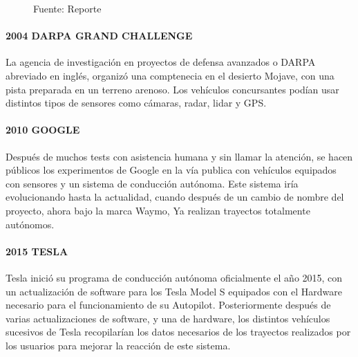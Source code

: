 \begin{figure}[H]
    \centering
    \qquad
    \caption[DAVE]{Fuente: Reporte \citep{LeCun:04-dave}}%
    \label{dave}%
\end{figure}

\paragraph{2004 DARPA GRAND CHALLENGE}
La agencia de investigación en proyectos de defensa avanzados o DARPA abreviado en inglés, organizó una comptenecia en el desierto Mojave, con una pista preparada en un terreno arenoso. Los vehículos concursantes podían usar distintos tipos de sensores como cámaras, radar, lidar y GPS. \citep{hooper_2004}

\paragraph{2010 GOOGLE}
Después de muchos tests con asistencia humana y sin llamar la atención, se hacen públicos los experimentos de Google en la vía publica con vehículos equipados con sensores y un sistema de conducción autónoma. Este sistema iría evolucionando hasta la actualidad, cuando después de un cambio de nombre del proyecto, ahora bajo la marca Waymo, Ya realizan trayectos totalmente autónomos. \citep{markoff_2010}

\paragraph{2015 TESLA}
Tesla inició su programa de conducción autónoma oficialmente el año 2015, con un actualización de software para los Tesla Model S equipados con el Hardware necesario para el funcionamiento de su Autopilot. \citep{nelson_2015} Posteriormente después de varias actualizaciones de software, y una de hardware, los distintos vehículos sucesivos de Tesla recopilarían los datos necesarios de los trayectos realizados por los usuarios para mejorar la reacción de este sistema. \citep{karpathy-scaledml}

